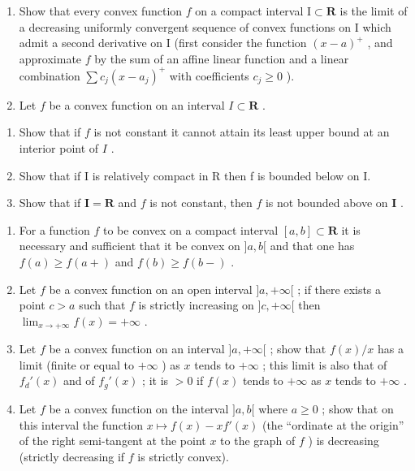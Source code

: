 \begin{enumerate}
\def\labelenumi{\arabic{enumi})}
\setcounter{enumi}{1}
\item
  Show that every convex function \(f\) on a compact interval \(\mathrm{I} \subset \mathbf{R}\) is the limit of a decreasing uniformly convergent sequence of convex functions on \(\mathrm{I}\) which admit a second derivative on \(\mathrm{I}\) (first consider the function \((x - a)^+\) , and approximate \(f\) by the sum of an affine linear function and a linear combination \(\sum c_j(x - a_j)^+\) with coefficients \(c_j \geqslant 0\) ).
\item
  Let \(f\) be a convex function on an interval \(I \subset \mathbf{R}\) .
\end{enumerate}

\begin{enumerate}
\def\labelenumi{\alph{enumi})}
\item
  Show that if \(f\) is not constant it cannot attain its least upper bound at an interior point of \(I\) .
\item
  Show that if I is relatively compact in R then f is bounded below on I.
\item
  Show that if \(\mathbf{I} = \mathbf{R}\) and \(f\) is not constant, then \(f\) is not bounded above on \(\mathbf{I}\) .
\end{enumerate}

\begin{enumerate}
\def\labelenumi{\arabic{enumi})}
\setcounter{enumi}{3}
\item
  For a function \(f\) to be convex on a compact interval \([a, b] \subset \mathbf{R}\) it is necessary and sufficient that it be convex on \(]a, b[\) and that one has \(f(a) \geqslant f(a+)\) and \(f(b) \geqslant f(b-)\) .
\item
  Let \(f\) be a convex function on an open interval \(]a, +\infty[\) ; if there exists a point \(c > a\) such that \(f\) is strictly increasing on \(]c, +\infty[\) then \(\lim_{x \to +\infty} f(x) = +\infty\) .
\item
  Let \(f\) be a convex function on an interval \(]a, +\infty[\) ; show that \(f(x)/x\) has a limit (finite or equal to \(+\infty\) ) as \(x\) tends to \(+\infty\) ; this limit is also that of \(f_d'(x)\) and of \(f_g'(x)\) ; it is \(>0\) if \(f(x)\) tends to \(+\infty\) as \(x\) tends to \(+\infty\) .
\item
  Let \(f\) be a convex function on the interval \(]a, b[\) where \(a \geqslant 0\) ; show that on this interval the function \(x \mapsto f(x) - xf'(x)\) (the ``ordinate at the origin'' of the right semi-tangent at the point \(x\) to the graph of \(f\) ) is decreasing (strictly decreasing if \(f\) is strictly convex).
\end{enumerate}


